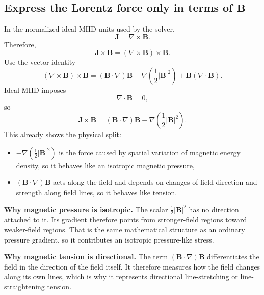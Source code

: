 \documentclass[11pt]{article}
\newcommand{\Bvec}{\mathbf{B}}
\newcommand{\Jvec}{\mathbf{J}}
\begin{document}
\subsection{Express the Lorentz force only in terms of $\Bvec$}
In the normalized ideal-MHD units used by the solver,
\begin{equation}
\Jvec = \nabla\times\Bvec.
\label{eq:ampere}
\end{equation}
Therefore,
\begin{equation}
\Jvec\times\Bvec = (\nabla\times\Bvec)\times\Bvec.
\label{eq:lorentz-as-B}
\end{equation}
Use the vector identity
\begin{equation}
(\nabla\times\Bvec)\times\Bvec = (\Bvec\cdot\nabla)\Bvec - \nabla\left(\frac12 |\Bvec|^2\right) + \Bvec(\nabla\cdot\Bvec).
\label{eq:lorentz-identity}
\end{equation}
Ideal MHD imposes
\begin{equation}
\nabla\cdot\Bvec = 0,
\label{eq:divB0}
\end{equation}
so
\begin{equation}
\Jvec\times\Bvec = (\Bvec\cdot\nabla)\Bvec - \nabla\left(\frac12 |\Bvec|^2\right).
\label{eq:lorentz-pressure-tension}
\end{equation}
This already shows the physical split:
\begin{itemize}[leftmargin=1.8em]
    \item $-\nabla(\frac12 |\Bvec|^2)$ is the force caused by spatial variation of magnetic energy density, so it behaves like an isotropic magnetic pressure,
    \item $(\Bvec\cdot\nabla)\Bvec$ acts along the field and depends on changes of field direction and strength along field lines, so it behaves like tension.
\end{itemize}

\begin{physicsbox}
\textbf{Why magnetic pressure is isotropic.}
The scalar $\frac12 |\Bvec|^2$ has no direction attached to it. Its gradient therefore points from stronger-field regions toward weaker-field regions. That is the same mathematical structure as an ordinary pressure gradient, so it contributes an isotropic pressure-like stress.

\textbf{Why magnetic tension is directional.}
The term $(\Bvec\cdot\nabla)\Bvec$ differentiates the field in the direction of the field itself. It therefore measures how the field changes along its own lines, which is why it represents directional line-stretching or line-straightening tension.
\end{physicsbox}
\end{document}
